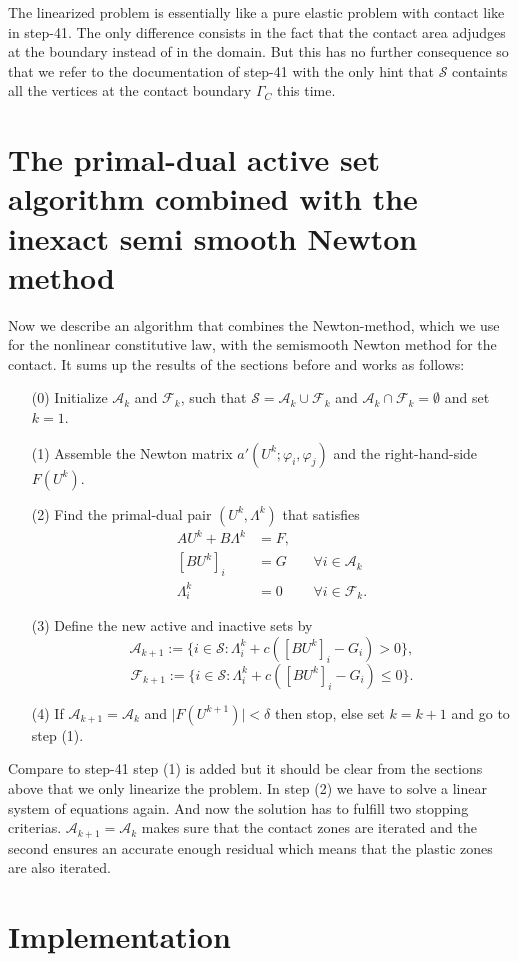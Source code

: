 \documentclass{article}
\begin{document}
The linearized problem is essentially like a pure elastic problem with contact like
in step-41. The only difference consists in the fact that the contact area
adjudges at the boundary instead of in the domain. But this has no further consequence
so that we refer to the documentation of step-41 with the only hint that
$\mathcal{S}$ containts all the vertices at the contact boundary $\Gamma_C$ this
time.

\section{The primal-dual active set algorithm combined with the inexact semi smooth
Newton method}

Now we describe an algorithm that combines the Newton-method, which we use for
the nonlinear constitutive law, with the semismooth Newton method for the contact. It
sums up the results of the sections before and works as follows:
\begin{itemize}
 \item[(0)] Initialize $\mathcal{A}_k$ and $\mathcal{F}_k$, such that $\mathcal{S} = \mathcal{A}_k \cup \mathcal{F}_k$ and $\mathcal{A}_k \cap \mathcal{F}_k = \emptyset$ and set $k = 1$.
 \item[(1)] Assemble the Newton matrix $a'(U^k;\varphi_i,\varphi_j)$ and the right-hand-side $F(U^k)$.
 \item[(2)] Find the primal-dual pair $(U^k,\Lambda^k)$ that satisfies
 \begin{align*}
 AU^k + B\Lambda^k & = F, &\\
 \left[BU^k\right]_i & = G & & \forall i\in\mathcal{A}_k\\
 \Lambda^k_i & = 0 & & \forall i\in\mathcal{F}_k.
 \end{align*}
 \item[(3)] Define the new active and inactive sets by
 $$\mathcal{A}_{k+1}:=\lbrace i\in\mathcal{S}:\Lambda^k_i +
 c\left(\left[BU^k\right]_i - G_i\right) > 0\rbrace,$$
 $$\mathcal{F}_{k+1}:=\lbrace i\in\mathcal{S}:\Lambda^k_i +
 c\left(\left[BU^k\right]_i - G_i\right) \leq 0\rbrace.$$
 \item[(4)] If $\mathcal{A}_{k+1} = \mathcal{A}_k$ and $\vert
 F\left(U^{k+1}\right) \vert < \delta$ then stop, else set $k=k+1$ and go to
 step (1).
\end{itemize}
\noindent
Compare to step-41 step (1) is added but it should be clear from the sections
above that we only linearize the problem. In step (2) we have to solve a linear
system of equations again. And now the solution has to fulfill two stopping criterias. $\mathcal{A}_{k+1} = \mathcal{A}_k$ makes sure that the contact zones
are iterated and the second ensures an accurate enough residual which means that
the plastic zones are also iterated.

\section{Implementation}
\end{document}

